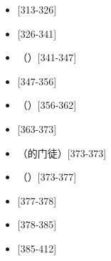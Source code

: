 \begin{itemize}
\item {} [313-326]
\end{itemize}

\begin{itemize}
\item {} [326-341]
\end{itemize}

\begin{itemize}
\item {}（）[341-347]
\end{itemize}

\begin{itemize}
\item {} [347-356]
\end{itemize}

\begin{itemize}
\item {}（）[356-362]
\end{itemize}

\begin{itemize}
\item {} [363-373]
\end{itemize}

\begin{itemize}
\item {}（的门徒）[373-373]
\end{itemize}

\begin{itemize}
\item {}（）[373-377]
\end{itemize}

\begin{itemize}
\item {} [377-378]
\end{itemize}

\begin{itemize}
\item {} [378-385]
\end{itemize}

\begin{itemize}
\item {} [385-412]
\end{itemize}

